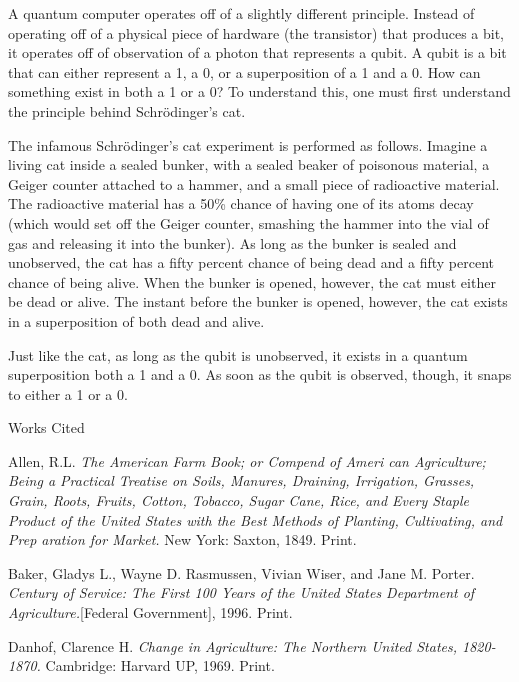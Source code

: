 \documentclass[12pt]{article}
\newcommand{\bibent}{\noindent \hangindent 40pt}
\newenvironment{workscited}{\newpage \begin{center} Works Cited \end{center}}{\newpage }
\begin{document}
\begin{flushleft}
A quantum computer operates off of a slightly different principle. Instead of operating off of a physical piece of hardware (the transistor) that produces a bit, it operates off of observation of a photon that represents a qubit. A qubit is a bit that can either represent a 1, a 0, or a superposition of a 1 and a 0. How can something exist in both a 1 or a 0? To understand this, one must first understand the principle behind Schr\"{o}dinger’s cat. 


The infamous Schr\"{o}dinger's cat experiment is performed as follows. Imagine a living cat inside a sealed bunker, with a sealed beaker of poisonous material, a Geiger counter attached to a hammer, and a small piece of radioactive material. The radioactive material has a 50\% chance of having one of its atoms decay (which would set off the Geiger counter, smashing the hammer into the vial of gas and releasing it into the bunker). As long as the bunker is sealed and unobserved, the cat has a fifty percent chance of being dead and a fifty percent chance of being alive. When the bunker is opened, however, the cat must either be dead or alive. The instant before the bunker is opened, however, the cat exists in a superposition of both dead and alive. 

Just like the cat, as long as the qubit is unobserved, it exists in a quantum superposition both a 1 and a 0. As soon as the qubit is observed, though, it snaps to either a 1 or a 0. 

 
\newpage




\begin{workscited}

\bibent
Allen, R.L. \textit{The American Farm Book; or Compend of Ameri can Agriculture; Being a Practical Treatise on Soils, Manures, Draining, Irrigation, Grasses, Grain, Roots, Fruits, Cotton, Tobacco, Sugar Cane, Rice, and Every Staple Product of the United States with the Best Methods of Planting, Cultivating, and Prep aration for Market.} New York: Saxton, 1849. Print.

\bibent
Baker, Gladys L., Wayne D. Rasmussen, Vivian Wiser, and Jane M. Porter. \textit{Century of Service: The First 100 Years of the United States Department of Agriculture.}[Federal Government], 1996. Print.

\bibent
Danhof, Clarence H. \textit{Change in Agriculture: The Northern United States, 1820-1870.} Cambridge: Harvard UP, 1969. Print.


\end{workscited}

\end{flushleft}
\end{document}
